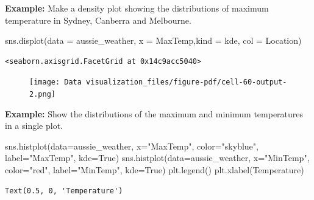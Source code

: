 \documentclass[
  letterpaper,
  DIV=11,
  numbers=noendperiod]{scrreprt}
\newenvironment{Shaded}{\begin{snugshade}}{\end{snugshade}}
\newcommand{\NormalTok}[1]{\textcolor[rgb]{0.00,0.23,0.31}{#1}}
\newcommand{\OperatorTok}[1]{\textcolor[rgb]{0.37,0.37,0.37}{#1}}
\newcommand{\StringTok}[1]{\textcolor[rgb]{0.13,0.47,0.30}{#1}}
\newcommand{\VariableTok}[1]{\textcolor[rgb]{0.07,0.07,0.07}{#1}}
\begin{document}
\textbf{Example:} Make a density plot showing the distributions of
maximum temperature in Sydney, Canberra and Melbourne.

\begin{Shaded}
\begin{Highlighting}[]
\NormalTok{sns.displot(data }\OperatorTok{=}\NormalTok{ aussie\_weather, x }\OperatorTok{=} \StringTok{\textquotesingle{}MaxTemp\textquotesingle{}}\NormalTok{,kind }\OperatorTok{=} \StringTok{\textquotesingle{}kde\textquotesingle{}}\NormalTok{, col }\OperatorTok{=} \StringTok{\textquotesingle{}Location\textquotesingle{}}\NormalTok{)}
\end{Highlighting}
\end{Shaded}

\begin{verbatim}
<seaborn.axisgrid.FacetGrid at 0x14c9acc5040>
\end{verbatim}

\begin{figure}[H]

{\centering \texttt{[image: Data visualization\_files/figure-pdf/cell-60-output-2.png]}

}

\end{figure}

\textbf{Example:} Show the distributions of the maximum and minimum
temperatures in a single plot.

\begin{Shaded}
\begin{Highlighting}[]
\NormalTok{sns.histplot(data}\OperatorTok{=}\NormalTok{aussie\_weather, x}\OperatorTok{=}\StringTok{"MaxTemp"}\NormalTok{, color}\OperatorTok{=}\StringTok{"skyblue"}\NormalTok{, label}\OperatorTok{=}\StringTok{"MaxTemp"}\NormalTok{, kde}\OperatorTok{=}\VariableTok{True}\NormalTok{)}
\NormalTok{sns.histplot(data}\OperatorTok{=}\NormalTok{aussie\_weather, x}\OperatorTok{=}\StringTok{"MinTemp"}\NormalTok{, color}\OperatorTok{=}\StringTok{"red"}\NormalTok{, label}\OperatorTok{=}\StringTok{"MinTemp"}\NormalTok{, kde}\OperatorTok{=}\VariableTok{True}\NormalTok{)}
\NormalTok{plt.legend()}
\NormalTok{plt.xlabel(}\StringTok{\textquotesingle{}Temperature\textquotesingle{}}\NormalTok{)}
\end{Highlighting}
\end{Shaded}

\begin{verbatim}
Text(0.5, 0, 'Temperature')
\end{verbatim}
\end{document}
